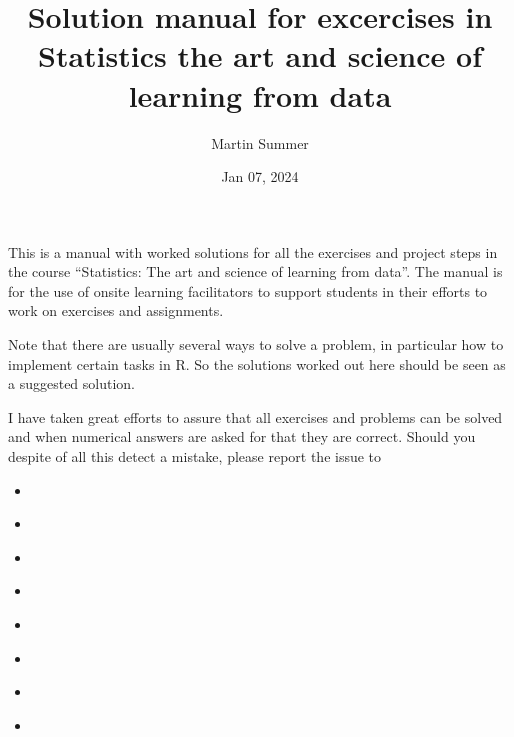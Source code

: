 \documentclass[letterpaper,10pt,english]{jupyterBook}
\title{Solution manual for excercises in Statistics the art and science of learning from data}
\date{Jan 07, 2024}
\author{Martin Summer}
\begin{document}
\pagestyle{empty}
\sphinxmaketitle
\pagestyle{plain}
\sphinxtableofcontents
\pagestyle{normal}
\label{\detokenize{intro::doc}}


\sphinxAtStartPar
This is a manual with worked solutions for all the exercises and
project steps in the course “Statistics: The art and science of learning
from data”. The manual is for the use of on\sphinxhyphen{}site learning facilitators to
support students in their efforts to work on exercises and assignments.

\sphinxAtStartPar
Note that there are usually several ways to solve a problem, in particular
how to implement certain tasks in R. So the solutions worked out here
should be seen as a suggested solution.

\sphinxAtStartPar
I have taken great efforts to assure that all exercises and problems can
be solved and when numerical answers are asked for that they are correct.
Should you despite of all this detect a mistake, please report the
issue to 
\begin{itemize}
\item {} 
\sphinxAtStartPar
{\hyperref[\detokenize{exercises_unit_1::doc}]{}}

\item {} 
\sphinxAtStartPar
{\hyperref[\detokenize{exercises_unit_2::doc}]{}}

\item {} 
\sphinxAtStartPar
{\hyperref[\detokenize{exercises_unit_3::doc}]{}}

\item {} 
\sphinxAtStartPar
{\hyperref[\detokenize{exercises_unit_4::doc}]{}}

\item {} 
\sphinxAtStartPar
{\hyperref[\detokenize{exercises_unit_5::doc}]{}}

\item {} 
\sphinxAtStartPar
{\hyperref[\detokenize{exercises_unit_6::doc}]{}}

\item {} 
\sphinxAtStartPar
{\hyperref[\detokenize{exercises_unit_7::doc}]{}}

\item {} 
\sphinxAtStartPar
{\hyperref[\detokenize{exercises_unit_8::doc}]{}}

\end{itemize}
\end{document}
